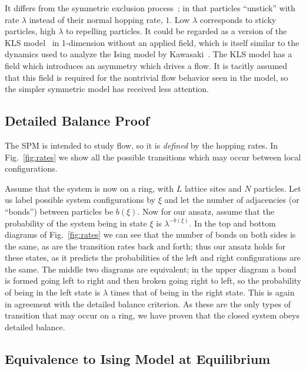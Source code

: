 \documentclass[
reprint, amsmath,amssymb,
]{revtex4-1}
\begin{document}
It differs from the symmetric exclusion
process~\cite{sugden2007dynamically, Kollmann2003, Lin2005,
  Hegde2014,Krapivsky2014, Imamura2017}; in that particles ``unstick''
with rate $\lambda$ instead of their normal hopping rate, $1$.  Low
$\lambda$ corresponds to sticky particles, high $\lambda$ to repelling
particles.
It could be regarded as a version of the KLS model~\cite{Katz1984,
  Zia2010, Kafri2003} in 1-dimension without an applied field, which
is itself similar to the dynamics used to analyze the Ising model by
Kawasaki~\cite{PhysRev.145.224}.  The KLS model has a field which
introduces an asymmetry which drives a flow.  It is tacitly assumed
that this field is required for the nontrivial flow behavior seen in
the model, so the simpler symmetric model has received less attention.


\subsection{Detailed Balance Proof} 
The SPM is intended to study flow, so it is {\it defined} by the
hopping rates.  In Fig.~\ref{fig:rates} we
show all the possible transitions which may occur between local
configurations. 

Assume that the system is now on a ring, with $L$
lattice sites and $N$ particles.  Let us label possible system
configurations by $\xi$ and let the number of adjacencies (or
``bonds'') between particles be $b(\xi)$. Now for our ansatz, assume
that the probability of the system being in state $\xi$ is
$\lambda^{-b(\xi)}$.  In the top and bottom diagrams of
Fig.~\ref{fig:rates} we can see that the number of bonds on
both sides is the same, as are the transition rates back and forth;
thus our ansatz holds for these states, as it predicts the
probabilities of the left and right configurations are the same. The
middle two diagrams are equivalent; in the upper diagram a
bond is formed going left to right and then broken going right to
left, so the probability of being in the left state is $\lambda$ times
that of being in the right state. This is again in agreement with the
detailed balance criterion. As these are the only types of transition
that may occur on a ring, we have proven that the closed system obeys
detailed balance.

\subsection{Equivalence to Ising Model at Equilibrium}
\end{document}
